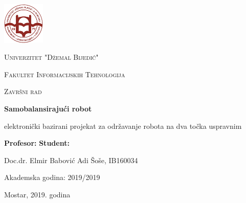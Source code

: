 \documentclass[12pt,a4paper]{report}
\begin{document}
\begin{titlepage}
	\centering
	\includegraphics[width=0.15\textwidth]{Images/Logo_UNMO.png}\par
	\vspace{1cm}
	{\scshape\LARGE Univerzitet "Džemal Bijedić" \par}
	{\scshape\Large Fakultet Informacijskih Tehnologija \par}

	\vspace{2.5cm}
	{\scshape\Large Završni rad\par}
	\vspace{0.7cm}

	{\huge\bfseries Samobalansirajući robot\par}
	\vspace{0.5cm}
	elektronički bazirani projekat za održavanje robota na dva točka uspravnim\par

	\vfill

	\textbf{Profesor:}
	\hfill
	\textbf{{Student:}}\par
	Doc.dr. Elmir Babović
	\hfill
	Adi Šoše, IB160034\par

	\vspace{1cm}
	Akademska godina: 2019/2019\par
	\vspace{0.3cm}
	Mostar, 2019. godina

\end{titlepage}
\end{document}
